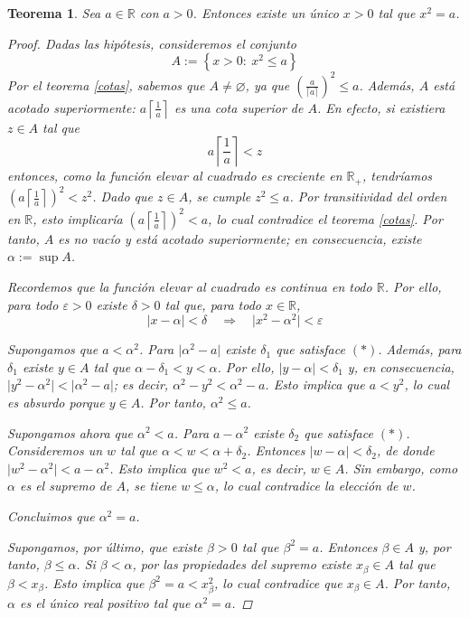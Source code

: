 \documentclass[10pt,a4paper]{article}
\theoremstyle{ts}
\newtheorem{teo}{Teorema}[section]
\newcommand{\rpar}[1]{\left( #1\right) }
\newcommand{\rllav}[1]{\left\lbrace #1\right\rbrace }
\begin{document}
\begin{teo}
Sea $a\in\mathbb{R}$ con $a>0$. Entonces existe un \'unico $x>0$ tal que $x^2=a$.
\begin{proof}
Dadas las hip\'otesis, consideremos el conjunto
\[A:=\rllav{x>0:\ x^2\leq a}\]
Por el teorema \ref{cotas}, sabemos que $A\neq\varnothing$, ya que $\rpar{\frac{a}{\lceil a\rceil}}^2\leq a$. Adem\'as, $A$ est\'a acotado superiormente: $a\left\lceil\frac{1}{a}\right\rceil$ es una cota superior de $A$. En efecto, si existiera $z\in A$ tal que
\[a\left\lceil\dfrac{1}{a}\right\rceil<z\]
entonces, como la funci\'on \textit{elevar al cuadrado} es creciente en $\mathbb{R}_+$, tendr\'iamos $(a\left\lceil\frac{1}{a}\right\rceil)^2<z^2$. Dado que $z\in A$, se cumple $z^2\leq a$. Por transitividad del orden en $\mathbb{R}$, esto implicar\'ia $(a\left\lceil\frac{1}{a}\right\rceil)^2<a$, lo cual contradice el teorema \ref{cotas}. Por tanto, $A$ es no vac\'io y est\'a acotado superiormente; en consecuencia, existe $\alpha :=\sup A$.

Recordemos que la funci\'on \textit{elevar al cuadrado} es continua en todo $\mathbb{R}$. Por ello, para todo $\varepsilon>0$ existe $\delta>0$ tal que, para todo $x\in\mathbb{R}$,
\[\tag{$\ast$}
\vert x-\alpha\vert <\delta\quad\Longrightarrow\quad  \vert x^2-\alpha^2\vert<\varepsilon\] 

Supongamos que $a<\alpha^2$. Para $\vert \alpha^2-a\vert$ existe $\delta_1$ que satisface $(\ast)$. Adem\'as, para $\delta_1$ existe $y\in A$ tal que $\alpha-\delta_1<y<\alpha$. Por ello, $\vert y-\alpha\vert<\delta_1$ y, en consecuencia, $\vert y^2-\alpha^2\vert<\vert\alpha^2-a\vert$; es decir, $\alpha^2-y^2<\alpha^2-a$. Esto implica que $a<y^2$, lo cual es absurdo porque $y\in A$. Por tanto, $\alpha^2\leq a$.

Supongamos ahora que $\alpha^2<a$. Para $a-\alpha^2$ existe $\delta_2$ que satisface $(\ast)$. Consideremos un $w$ tal que $\alpha<w<\alpha+\delta_2$. Entonces $\vert w-\alpha\vert<\delta_2$, de donde $\vert w^2-\alpha^2\vert<a-\alpha^2$. Esto implica que $w^2<a$, es decir, $w\in A$. Sin embargo, como $\alpha$ es el supremo de $A$, se tiene $w\leq\alpha$, lo cual contradice la elecci\'on de $w$.

Concluimos que $\alpha^2=a$.

Supongamos, por \'ultimo, que existe $\beta>0$ tal que $\beta^2=a$. Entonces $\beta\in A$ y, por tanto, $\beta\leq\alpha$. Si $\beta<\alpha$, por las propiedades del supremo existe $x_\beta\in A$ tal que $\beta<x_\beta$. Esto implica que $\beta^2=a<x_\beta^2$, lo cual contradice que $x_\beta\in A$. Por tanto, $\alpha$ es el \'unico real positivo tal que $\alpha^2=a$.
\end{proof}
\end{teo}
\end{document}
